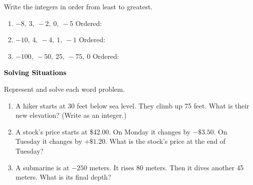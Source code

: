 \documentclass[12pt, letterpaper, fleql]{article}
\newcommand{\blanklong}{\underline{\hspace{6.5cm}}}
\begin{document}
\noindent
Write the integers in order from least to greatest.

\vspace{3mm}
\begin{enumerate}[itemsep=2.2cm, leftmargin=0.6cm]
\item $-8,\ 3,\ -2,\ 0,\ -5$ \quad Ordered: \blanklong

\vspace{2cm}

\item $-10,\ 4,\ -4,\ 1,\ -1$ \quad Ordered: \blanklong

\vspace{2cm}

\item $-100,\ -50,\ 25,\ -75,\ 0$ \quad Ordered: \blanklong

\vspace{2cm}

\end{enumerate}

\newpage

\begin{tcolorbox}[colback=black!10]
\large\textcolor{black}{\textbf{Solving Situations}}
\end{tcolorbox}

\noindent
Represent and solve each word problem.

\vspace{3mm}
\begin{enumerate}[itemsep=2.3cm, leftmargin=0.6cm]
\item A hiker starts at 30 feet below sea level. They climb up 75 feet. What is their new elevation? (Write as an integer.)

\vspace{2.2cm}

\item A stock's price starts at \$42.00. On Monday it changes by $-\$3.50$. On Tuesday it changes by $+\$1.20$. What is the stock's price at the end of Tuesday?

\vspace{2.2cm}

\item A submarine is at $-250$ meters. It rises 80 meters. Then it dives another 45 meters. What is its final depth?

\vspace{2.2cm}

\end{enumerate}
\end{document}
